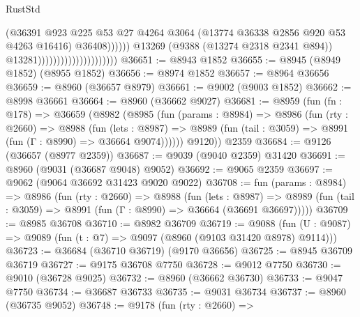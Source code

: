 \begin{lexlean}{RustStd}
\begin{coremodule}
                                                        (@36391
                                                          @923
                                                          @225
                                                          @53
                                                          @27
                                                          @4264
                                                          @3064
                                                          (@13774
                                                            @36338
                                                            @2856
                                                            @920
                                                            @53
                                                            @4263
                                                            @16416)
                                                          @36408))))))
                                              @13269
                                              (@9388 (@13274 @2318 @2341 @894))
                                              @13281)))))))))))))))))))))
@36651 := @8943 @1852
@36655 := @8945 (@8949 @1852) (@8955 @1852)
@36656 := @8974 @1852
@36657 := @8964 @36656
@36659 := @8960 (@36657 @8979)
@36661 := @9002 (@9003 @1852)
@36662 := @8998 @36661
@36664 := @8960 (@36662 @9027)
@36681 := @8959
    (fun (fn : @178) =>
    @36659
      (@8982
        (@8985
          (fun (params : @8984) =>
          @8986
            (fun (rty : @2660) =>
            @8988
              (fun (lets : @8987) =>
              @8989 (fun (tail : @3059) => @8991 (fun (Γ : @8990) => @36664 @9074))))))
        @9120))
    @2359
@36684 := @9126 (@36657 (@8977 @2359))
@36687 := @9039 (@9040 @2359) @31420
@36691 := @8960 (@9031 (@36687 @9048) @9052)
@36692 := @9065 @2359
@36697 := @9062 (@9064 @36692 @31423 @9020 @9022)
@36708 := fun (params : @8984) =>
  @8986
    (fun (rty : @2660) =>
    @8988
      (fun (lets : @8987) =>
      @8989 (fun (tail : @3059) => @8991 (fun (Γ : @8990) => @36664 (@36691 @36697)))))
@36709 := @8985 @36708
@36710 := @8982 @36709
@36719 := @9088
    (fun (U : @9087) => @9089 (fun (t : @7) => @9097 (@8960 (@9103 @31420 @8978) @9114)))
@36723 := @36684 (@36710 @36719) (@9170 @36656)
@36725 := @8945 @36709 @36719
@36727 := @9175 @36708 @7750
@36728 := @9012 @7750
@36730 := @9010 (@36728 @9025)
@36732 := @8960 (@36662 @36730)
@36733 := @9047 @7750
@36734 := @36687 @36733
@36735 := @9031 @36734
@36737 := @8960 (@36735 @9052)
@36748 := @9178
    (fun (rty : @2660) =>

\end{coremodule}
\end{lexlean}
